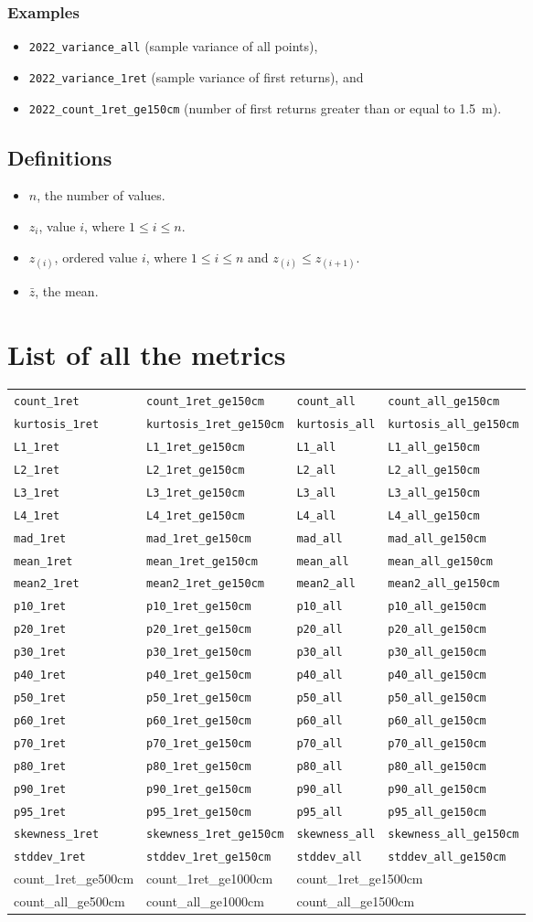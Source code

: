 \documentclass[10pt,english,a4paper
]{article}
\newcommand{\tabrow}[1]{\mname{#1\_1ret}	& \mname{#1\_1ret\_ge150cm}	& \mname{#1\_all}	& \mname{#1\_all\_ge150cm}	\\}
\newcommand{\mname}[1]{{\small\texttt{#1}}}
\newcommand{\meanz}{\ensuremath{\bar{z}}}
\begin{document}
\subsubsection{Examples}
\begin{itemize}
	\item \mname{2022\_variance\_all} (sample variance of all points), 
	\item \mname{2022\_variance\_1ret} (sample variance of first returns), and 
	\item \mname{2022\_count\_1ret\_ge150cm} (number of first returns greater than or equal to 1.5~m). 
\end{itemize}


\subsection{Definitions}\label{sec:details}

\begin{itemize}
	\item $n$, the number of values.
	\item $z_i$, value $i$, where $1\le i\le n$.
	\item $z_{(i)}$, ordered value $i$, where $1\le i\le n$ and $z_{(i)}\le z_{(i+1)}$.
	\item $\meanz$, the mean.
\end{itemize}










\hspace{2em}


\section{List of all the metrics}

{\small
\begin{tabular}{@{}llll@{}}
	\hline
	\tabrow{count}
	\tabrow{kurtosis}
	\tabrow{L1}
	\tabrow{L2}
	\tabrow{L3}
	\tabrow{L4}
	\tabrow{mad}
	\tabrow{mean}
	\tabrow{mean2}
	\tabrow{p10}
	\tabrow{p20}
	\tabrow{p30}
	\tabrow{p40}
	\tabrow{p50}
	\tabrow{p60}
	\tabrow{p70}
	\tabrow{p80}
	\tabrow{p90}
	\tabrow{p95}
	\tabrow{skewness}
	\tabrow{stddev}
	\hline
	count\_1ret\_ge500cm	& count\_1ret\_ge1000cm	& \multicolumn{2}{l}{count\_1ret\_ge1500cm}	\\
	count\_all\_ge500cm	& count\_all\_ge1000cm	& \multicolumn{2}{l}{count\_all\_ge1500cm}	\\
	\hline
\end{tabular}}

\end{document}
